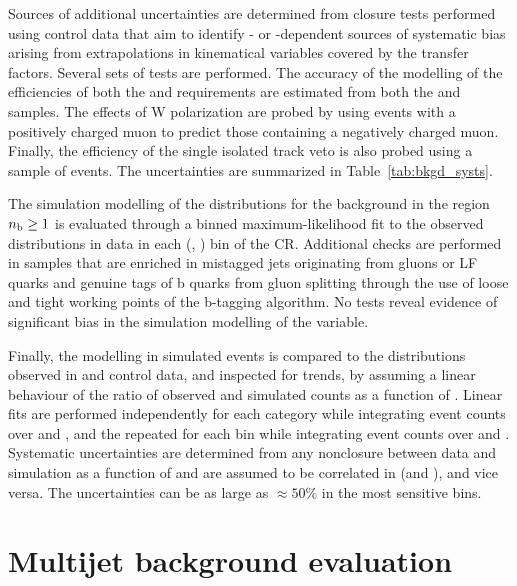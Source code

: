 \endgroup

Sources of additional uncertainties are determined from closure tests
performed using control data that aim to identify \njet- or
\scalht-dependent sources of systematic bias arising from
extrapolations in kinematical variables covered by the transfer
factors. Several sets of tests are performed. The accuracy of the
modelling of the efficiencies of both the \alphat and \bdphi
requirements are estimated from both the \mj and \mmj samples. The
effects of W polarization are probed by using \mj events with a
positively charged muon to predict those containing a negatively
charged muon. Finally, the efficiency of the single isolated track
veto is also probed using a sample of \mj events. The uncertainties
are summarized in Table~\ref{tab:bkgd_systs}.

The simulation modelling of the \nb distributions for the \znunuj
background in the region $n_{\mathrm{b}} \geq 1$ is evaluated through a binned
maximum-likelihood fit to the observed \nb distributions in data in
each (\njet, \scalht) bin of the \mmj CR. Additional checks are
performed in \mmj samples that are enriched in mistagged jets
originating from gluons or LF quarks and genuine tags of b quarks from
gluon splitting through the use of loose and tight working points of
the b-tagging algorithm. No tests reveal evidence of significant bias
in the simulation modelling of the \nb variable.

Finally, the \mht modelling in simulated events is compared to the
distributions observed in \mj and \mmj control data, and inspected for
trends, by assuming a linear behaviour of the ratio of observed and
simulated counts as a function of \mht. Linear fits are performed
independently for each \njet category while integrating event counts
over \nb and \scalht, and the repeated for each \scalht bin while
integrating event counts over \njet and \nb. Systematic uncertainties
are determined from any nonclosure between data and simulation as a
function of \njet and are assumed to be correlated in \scalht (and
\nb), and vice versa. The uncertainties can be as large as
${\approx}50\%$ in the most sensitive \mht bins.


\section{Multijet background evaluation}
\label{sec:qcd}

